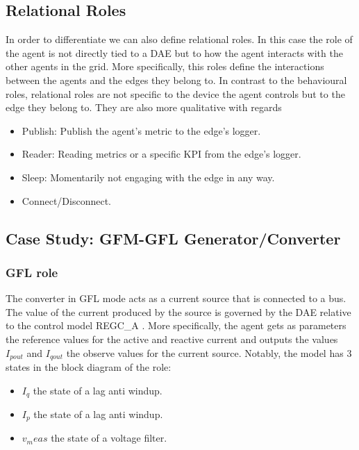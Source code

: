 \subsection{Relational Roles}

In order to differentiate we can also define relational roles. In this case the role of the agent is not directly tied to a DAE but to how the agent interacts with the other agents in the grid.
More specifically, this roles define the interactions between the agents and the edges they belong to. In contrast to the behavioural roles, relational roles are not specific to the device the agent controls but to the edge they belong to. They are also more qualitative with regards 

\begin{itemize}
    \item Publish: Publish the agent's metric to the edge's logger.
    \item Reader: Reading metrics or a specific KPI from the edge's logger.
    \item Sleep: Momentarily not engaging with the edge in any way.
    \item Connect/Disconnect.
\end{itemize}

\subsection{Case Study: GFM-GFL Generator/Converter}

\subsubsection{GFL role}

The converter in GFL mode acts as a current source that is connected to a bus. The value of the current produced by the source is governed by the DAE
relative to the control model REGC_A \cite{model:REGC_A}. More specifically, the agent gets as parameters the reference values for the active and reactive current and outputs the values $I_{pout}$ and $I_{qout}$ the observe values for the current source. Notably, the model has 3 states in the block diagram of the role:

\begin{itemize}
    \item $I_q$ the state of a lag anti windup.
    \item $I_p$ the state of a lag anti windup.
    \item $v_meas$ the state of a voltage filter.
\end{itemize}

